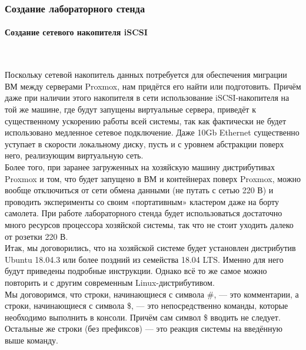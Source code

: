 \documentclass[14pt, a4paper]{article}
\begin{document}
\subsubsection*{Создание лабораторного стенда} 

\paragraph*{Создание сетевого накопителя iSCSI} \mbox{}\\

Поскольку сетевой накопитель данных потребуется для обеспечения миграции ВМ между серверами
Proxmox, нам придётся его найти или подготовить. Причём даже при наличии этого накопителя в сети
использование iSCSI-накопителя на той же машине, где будут запущены виртуальные сервера,
приведёт к существенному ускорению работы всей системы, так как фактически не будет
использовано медленное сетевое подключение. Даже 10Gb Ethernet существенно уступает в скорости
локальному диску, пусть и с уровнем абстракции поверх него, реализующим виртуальную сеть.\\

Более того, при заранее загруженных на хозяйскую машину дистрибутивах Proxmox и том, что будет
запущено в ВМ и контейнерах поверх Proxmox, можно вообще отключиться от сети обмена данными
(не путать с сетью 220 В) и проводить эксперименты со своим «портативным» кластером даже на
борту самолета. При работе лабораторного стенда будет использоваться достаточно много ресурсов
процессора хозяйской системы, так что не стоит уходить далеко от розетки 220 В.\\

Итак, мы договорились, что на хозяйской системе будет установлен дистрибутив Ubuntu 18.04.3 или
более поздний из семейства 18.04 LTS. Именно для него будут приведены подробные инструкции.
Однако всё то же самое можно повторить и с другим современным Linux-дистрибутивом.\\

Мы договоримся, что строки, начинающиеся с символа \#, — это комментарии, а строки,
начинающиеся с символа \$, — это непосредственно команды, которые необходимо выполнить в
консоли. Причём сам символ \$ вводить не следует. Остальные же строки (без префиксов) — это
реакция системы на введённую выше команду.
\end{document}
